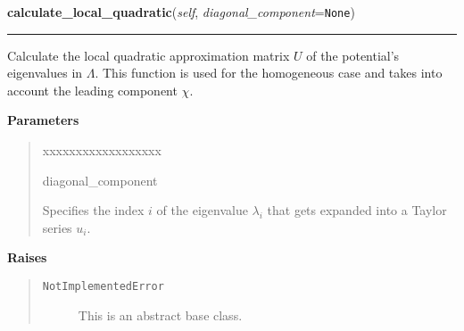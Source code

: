     \vspace{0.5ex}

\hspace{.8\funcindent}\begin{boxedminipage}{\funcwidth}

    \raggedright \textbf{calculate\_local\_quadratic}(\textit{self}, \textit{diagonal\_component}={\tt None})

    \vspace{-1.5ex}

    \rule{\textwidth}{0.5\fboxrule}
\setlength{\parskip}{2ex}
    Calculate the local quadratic approximation matrix $U$ of the
    potential's eigenvalues in $\Lambda$. This function is
    used for the homogeneous case and takes into account the leading
    component $\chi$.

\setlength{\parskip}{1ex}
      \textbf{Parameters}
      \vspace{-1ex}

      \begin{quote}
        \begin{Ventry}{xxxxxxxxxxxxxxxxxx}

          \item[diagonal\_component]

          Specifies the index $i$ of the eigenvalue
          $\lambda_i$ that gets expanded into a Taylor
          series $u_i$.

        \end{Ventry}

      \end{quote}

      \textbf{Raises}
    \vspace{-1ex}

      \begin{quote}
        \begin{description}

          \item[\texttt{NotImplementedError}]

          This is an abstract base class.

        \end{description}

      \end{quote}

    \end{boxedminipage}

    \label{MatrixPotential:MatrixPotential:evaluate_local_quadratic_at}

